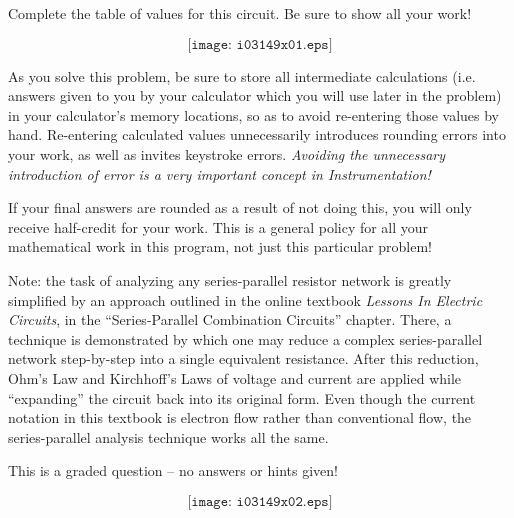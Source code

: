 

Complete the table of values for this circuit.  Be sure to show all your work!

$$\texttt{[image: i03149x01.eps]}$$

As you solve this problem, be sure to store all intermediate calculations (i.e. answers given to you by your calculator which you will use later in the problem) in your calculator's memory locations, so as to avoid re-entering those values by hand.  Re-entering calculated values unnecessarily introduces rounding errors into your work, as well as invites keystroke errors.  {\it Avoiding the unnecessary introduction of error is a very important concept in Instrumentation!}

If your final answers are rounded as a result of not doing this, you will only receive half-credit for your work.  This is a general policy for all your mathematical work in this program, not just this particular problem!


\vfil 

Note: the task of analyzing any series-parallel resistor network is greatly simplified by an approach outlined in the online textbook {\it Lessons In Electric Circuits}, in the ``Series-Parallel Combination Circuits'' chapter.  There, a technique is demonstrated by which one may reduce a complex series-parallel network step-by-step into a single equivalent resistance.  After this reduction, Ohm's Law and Kirchhoff's Laws of voltage and current are applied while ``expanding'' the circuit back into its original form.  Even though the current notation in this textbook is electron flow rather than conventional flow, the series-parallel analysis technique works all the same.

\eject






This is a graded question -- no answers or hints given!







$$\texttt{[image: i03149x02.eps]}$$



